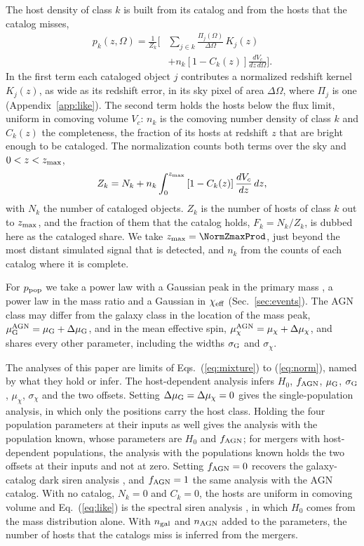 \documentclass[aps,prd,reprint,twocolumn,superscriptaddress,nofootinbib,floatfix,nolongbibliography]{revtex4-2}
\newcommand{\chieff}{\chi_{\rm eff}}
\newcommand{\fagn}{f_{\rm AGN}}
\newcommand{\ngal}{n_{\rm gal}}
\newcommand{\nagn}{n_{\rm AGN}}
\newcommand{\dmuG}{\Delta\mu_{\rm G}}
\newcommand{\dmuchi}{\Delta\mu_\chi}
\begin{document}
The host density of class $k$ is built from its catalog and from the hosts
that the catalog misses,
\begin{equation}
\begin{split}
p_k(z,\Omega)=\frac{1}{Z_k}\bigg[&\sum_{j\in k}\frac{\Pi_j(\Omega)}{\Delta\Omega}\,K_j(z)\\
&+n_k\left[1-C_k(z)\right]\frac{dV_c}{dz\,d\Omega}\bigg] .
\end{split}
\label{eq:hosts}
\end{equation}
In the first term each cataloged object $j$ contributes a normalized
redshift kernel $K_j(z)$, as wide as its redshift error, in its sky pixel of
area $\Delta\Omega$, where $\Pi_j$ is one (Appendix~\ref{app:like}). The
second term holds the hosts below the flux limit, uniform in comoving volume
$V_c$: $n_k$ is the comoving number density of class $k$ and $C_k(z)$ the
completeness, the fraction of its hosts at redshift $z$ that are bright
enough to be cataloged. The normalization counts both terms over the sky and
$0<z<z_{\rm max}$,
\begin{equation}
Z_k=N_k+n_k\int_0^{z_{\rm max}}\left[1-C_k(z)\right]\frac{dV_c}{dz}\,dz ,
\label{eq:norm}
\end{equation}
with $N_k$ the number of cataloged objects. $Z_k$ is the number of hosts of
class $k$ out to $z_{\rm max}$, and the fraction of them that the catalog
holds, $F_k=N_k/Z_k$, is dubbed here as the cataloged share. We take $z_{\rm
max}=\NormZmaxProd$, just beyond the most distant simulated signal that is
detected, and $n_k$ from the counts of each catalog where it is complete.

For $p_{\rm pop}$ we take a power law with a Gaussian peak in the primary
mass \cite{Talbot:2018cva}, a power law in the mass ratio and a Gaussian in
$\chieff$ (Sec.~\ref{sec:events}). The AGN class may differ from the galaxy
class in the location of the mass peak, $\mu_{\rm G}^{\rm AGN}=\mu_{\rm
G}+\dmuG$, and in the mean effective spin, $\mu_\chi^{\rm
AGN}=\mu_\chi+\dmuchi$, and shares every other parameter, including the
widths $\sigma_{\rm G}$ and $\sigma_\chi$.

The analyses of this paper are limits of Eqs.~(\ref{eq:mixture}) to
(\ref{eq:norm}), named by what they hold or infer. The host-dependent
analysis infers $H_0$, $\fagn$, $\mu_{\rm G}$, $\sigma_{\rm G}$, $\mu_\chi$,
$\sigma_\chi$ and the two offsets. Setting $\dmuG=\dmuchi=0$ gives the
single-population analysis, in which only the positions carry the host
class. Holding the four population parameters at their inputs as well gives
the analysis with the population known, whose parameters are $H_0$ and
$\fagn$; for mergers with host-dependent populations, the analysis with the
populations known holds the two offsets at their inputs and not at zero.
Setting $\fagn=0$ recovers the galaxy-catalog dark siren analysis
\cite{Gray:2019ksv,Gair:2022zsa}, and $\fagn=1$ the same analysis with the AGN
catalog. With no catalog, $N_k=0$ and $C_k=0$, the hosts are uniform in
comoving volume and Eq.~(\ref{eq:like}) is the spectral siren analysis
\cite{Farr:2019twy,Ezquiaga:2022zkx}, in which $H_0$ comes from the mass
distribution alone. With $\ngal$ and $\nagn$ added to the parameters, the
number of hosts that the catalogs miss is inferred from the mergers.
\end{document}
